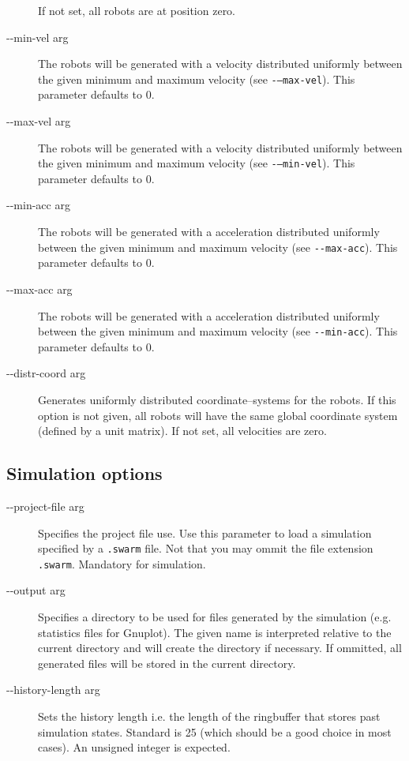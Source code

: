 \documentclass[a4paper,halfparskip,11pt,twoside]{scrartcl}
\begin{document}
\begin{description}
 If not set, all robots are at position zero.
	\item [-{}-min-vel arg] The robots will be generated with a velocity distributed uniformly between the given minimum and maximum velocity (see {\tt -{}---max-vel}). This parameter defaults to 0.
	\item [-{}-max-vel arg] The robots will be generated with a velocity distributed uniformly between the given minimum and maximum velocity (see {\tt -{}---min-vel}). This parameter defaults to 0.
	\item [-{}-min-acc arg] The robots will be generated with a acceleration distributed uniformly between the given minimum and maximum velocity (see {\tt -{}-max-acc}). This parameter defaults to 0.
	\item [-{}-max-acc arg] The robots will be generated with a acceleration distributed uniformly between the given minimum and maximum velocity (see {\tt -{}-min-acc}). This parameter defaults to 0.
	\item [-{}-distr-coord arg] Generates uniformly distributed coordinate--systems for the robots. If this option is not given, all robots will have the same global coordinate system (defined by a unit matrix).
 If not set, all velocities are zero.
\end{description}

\subsection{Simulation options}
\begin{description}
	\item [-{}-project-file arg] Specifies the project file use. Use this parameter to load a simulation specified by a {\tt .swarm} file. Not that you may ommit the file extension {\tt .swarm}. Mandatory for simulation.
	\item [-{}-output arg] Specifies a directory to be used for files generated by the simulation (e.g. statistics files for Gnuplot). The given name is interpreted relative to the current directory and will create the directory if necessary. If ommitted, all generated files will be stored in the current directory.
	\item [-{}-history-length arg] Sets the history length i.e. the length of the ringbuffer that stores past simulation states. Standard is 25 (which should be a good choice in most cases). An unsigned integer is expected.
\end{description}
\end{document}
